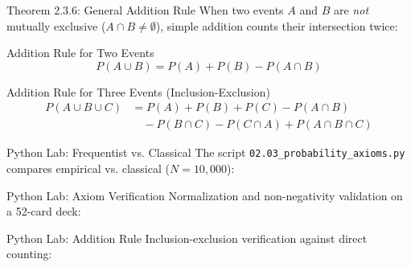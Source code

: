 \documentclass[10pt,aspectratio=169]{beamer}
\begin{document}
\begin{frame}{Theorem 2.3.6: General Addition Rule}
  \small When two events $A$ and $B$ are \emph{not} mutually exclusive ($A \cap B \neq \emptyset$), simple addition counts their intersection twice: \pause

  \vspace{0.2em}
  \begin{block}{Addition Rule for Two Events}
    $$P(A \cup B) = P(A) + P(B) - P(A \cap B)$$
  \end{block}

  \vspace{0.2em}
  \pause
  \begin{block}{Addition Rule for Three Events (Inclusion-Exclusion)}
    \begin{align*}
      P(A \cup B \cup C) &= P(A) + P(B) + P(C) - P(A \cap B) \\
                         &\quad - P(B \cap C) - P(C \cap A) + P(A \cap B \cap C)
    \end{align*}
  \end{block}
\end{frame}

\begin{frame}[fragile]{Python Lab: Frequentist vs. Classical}
  The script \texttt{02.03\_probability\_axioms.py} compares empirical vs. classical ($N = 10,000$):
  \vspace{0.2em}
  {
  }
\end{frame}

\begin{frame}[fragile]{Python Lab: Axiom Verification}
  Normalization and non-negativity validation on a 52-card deck:
  \vspace{0.2em}
  {
  }
\end{frame}

\begin{frame}[fragile]{Python Lab: Addition Rule}
  Inclusion-exclusion verification against direct counting:
  \vspace{0.2em}
  {
  }
\end{frame}
\end{document}
